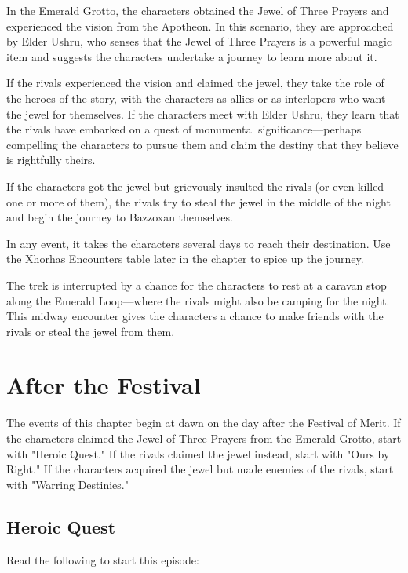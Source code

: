 \documentclass[10pt,a4paper,twoside,twocolumn,openany,nodeprecatedcode]{dndbook}
\begin{document}
\begin{description}[nolistsep]
\item[Heroic Quest.]
In the Emerald Grotto, the characters obtained the Jewel of Three Prayers and experienced the vision from the Apotheon. In this scenario, they are approached by Elder Ushru, who senses that the Jewel of Three Prayers is a powerful magic item and suggests the characters undertake a journey to learn more about it.
\item[Ours by Right.]
If the rivals experienced the vision and claimed the jewel, they take the role of the heroes of the story, with the characters as allies or as interlopers who want the jewel for themselves. If the characters meet with Elder Ushru, they learn that the rivals have embarked on a quest of monumental significance—perhaps compelling the characters to pursue them and claim the destiny that they believe is rightfully theirs.
\item[Warring Destinies.]
If the characters got the jewel but grievously insulted the rivals (or even killed one or more of them), the rivals try to steal the jewel in the middle of the night and begin the journey to Bazzoxan themselves.
\end{description}

In any event, it takes the characters several days to reach their destination. Use the Xhorhas Encounters table later in the chapter to spice up the journey.

The trek is interrupted by a chance for the characters to rest at a caravan stop along the Emerald Loop—where the rivals might also be camping for the night. This midway encounter gives the characters a chance to make friends with the rivals or steal the jewel from them.

\section{After the Festival}
The events of this chapter begin at dawn on the day after the Festival of Merit. If the characters claimed the Jewel of Three Prayers from the Emerald Grotto, start with "Heroic Quest." If the rivals claimed the jewel instead, start with "Ours by Right." If the characters acquired the jewel but made enemies of the rivals, start with "Warring Destinies."

\subsection{Heroic Quest}
Read the following to start this episode:
\end{document}
